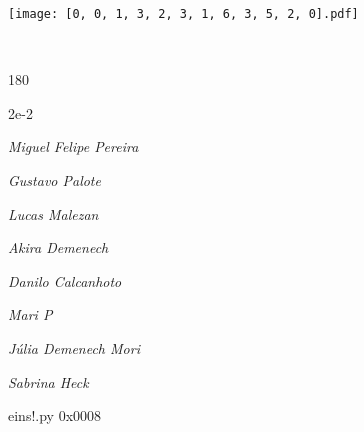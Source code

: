\documentclass[12pt]{article}
\begin{document}
\texttt{[image: [0, 0, 1, 3, 2, 3, 1, 6, 3, 5, 2, 0].pdf]}


	\hfill	  	  


\pagebreak			

	\ 
	\vfill
	\begin{turn}{180}	
		\begin{minipage}{\textwidth}
		  	\ttfamily %
			\centering
			{\Huge 2e-2}
		  
			\hfill
		  
			

\textit{\small Miguel Felipe Pereira}

\textit{\small Gustavo Palote}

\textit{\small Lucas Malezan}

\textit{\small Akira Demenech}

\textit{\small Danilo Calcanhoto}

\textit{\small Mari P}

\textit{\small Júlia Demenech Mori}

\textit{\small Sabrina Heck}

\bigskip

eins!.py
0x0008


		\end{minipage}	
	\end{turn}
	\vfill
	\

\pagebreak
\end{document}
